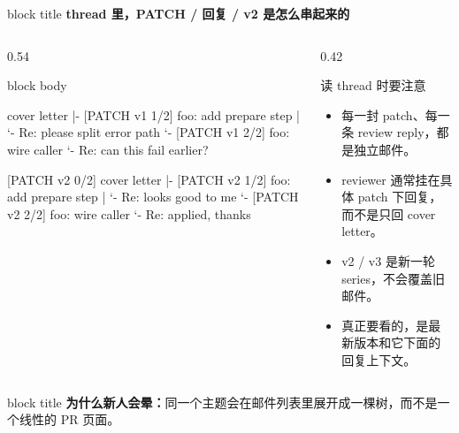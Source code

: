 \documentclass[aspectratio=169,professionalfonts]{beamer}
\newcommand{\sectiontitle}[1]{
  \begin{beamercolorbox}[wd=\linewidth,sep=0.7em,rounded=true]{block title}
    \usebeamerfont*{frametitle}\Large\bfseries #1
  \end{beamercolorbox}
  \vspace{0.4em}
}
\begin{document}
\begin{frame}[fragile]
  \sectiontitle{thread 里，PATCH / 回复 / v2 是怎么串起来的}
  \scriptsize
  \begin{columns}[T,totalwidth=\textwidth]
    \begin{column}{0.54\textwidth}
      \begin{beamercolorbox}[wd=\linewidth,sep=0.75em,rounded=true]{block body}
\begin{semiverbatim}
[PATCH v1 0/2] cover letter
|- [PATCH v1 1/2] foo: add prepare step
|  `- Re: please split error path
`- [PATCH v1 2/2] foo: wire caller
   `- Re: can this fail earlier?

[PATCH v2 0/2] cover letter
|- [PATCH v2 1/2] foo: add prepare step
|  `- Re: looks good to me
`- [PATCH v2 2/2] foo: wire caller
   `- Re: applied, thanks
\end{semiverbatim}
      \end{beamercolorbox}
    \end{column}
    \begin{column}{0.42\textwidth}
      \begin{exampleblock}{读 thread 时要注意}
        \begin{itemize}
          \item 每一封 patch、每一条 review reply，都是独立邮件。
          \item reviewer 通常挂在具体 patch 下回复，而不是只回 cover letter。
          \item v2 / v3 是新一轮 series，不会覆盖旧邮件。
          \item 真正要看的，是最新版本和它下面的回复上下文。
        \end{itemize}
      \end{exampleblock}
    \end{column}
  \end{columns}
  \vspace{0.3em}
  \begin{beamercolorbox}[wd=\linewidth,sep=0.7em,rounded=true]{block title}
    \textbf{为什么新人会晕：}同一个主题会在邮件列表里展开成一棵树，而不是一个线性的 PR 页面。
  \end{beamercolorbox}
\end{frame}
\end{document}

